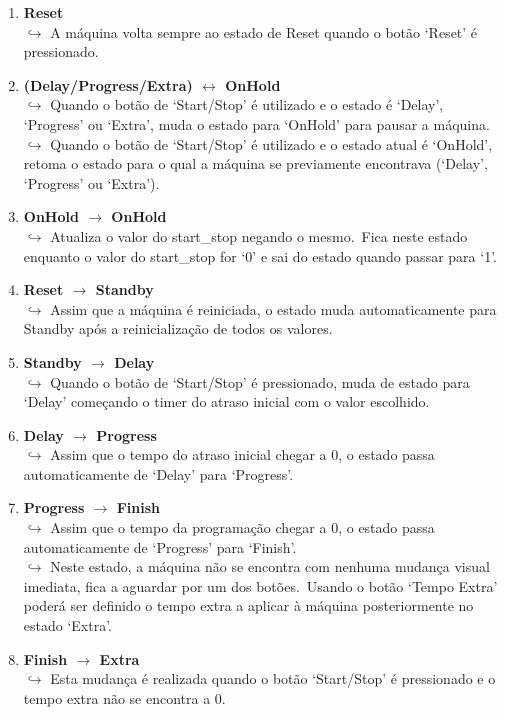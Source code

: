 \begin{enumerate}
    \item \textbf{Reset}
        \\$\hookrightarrow$ A máquina volta sempre ao estado de Reset quando o botão `Reset' é pressionado.
    \item \textbf{(Delay/Progress/Extra) $\leftrightarrow$ OnHold}
        \\$\hookrightarrow$ Quando o botão de `Start/Stop' é utilizado e o estado é `Delay', `Progress' ou `Extra', muda o estado para `OnHold' para pausar a máquina.
        \\$\hookrightarrow$ Quando o botão de `Start/Stop' é utilizado e o estado atual é `OnHold', retoma o estado para o qual a máquina se previamente encontrava (`Delay', `Progress' ou `Extra').
    \item \textbf{OnHold $\rightarrow$ OnHold}
        \\$\hookrightarrow$ Atualiza o valor do start\_stop negando o mesmo.\ Fica neste estado enquanto o valor do start\_stop for `0' e sai do estado quando passar para `1'.
    \item \textbf{Reset $\rightarrow$ Standby}
        \\$\hookrightarrow$ Assim que a máquina é reiniciada, o estado muda automaticamente para Standby após a reinicialização de todos os valores.
    \item \textbf{Standby $\rightarrow$ Delay}
        \\$\hookrightarrow$ Quando o botão de `Start/Stop' é pressionado, muda de estado para `Delay' começando o timer do atraso inicial com o valor escolhido.
    \item \textbf{Delay $\rightarrow$ Progress}
        \\$\hookrightarrow$ Assim que o tempo do atraso inicial chegar a 0, o estado passa automaticamente de `Delay' para `Progress'.
    \item \textbf{Progress $\rightarrow$ Finish}
        \\$\hookrightarrow$ Assim que o tempo da programação chegar a 0, o estado passa automaticamente de `Progress' para `Finish'.
        \\$\hookrightarrow$ Neste estado, a máquina não se encontra com nenhuma mudança visual imediata, fica a aguardar por um dos botões.\ Usando o botão `Tempo Extra' poderá ser definido o tempo extra a aplicar à máquina posteriormente no estado `Extra'.
    \item \textbf{Finish $\rightarrow$ Extra}
        \\$\hookrightarrow$ Esta mudança é realizada quando o botão `Start/Stop' é pressionado e o tempo extra não se encontra a 0.

\end{enumerate}

